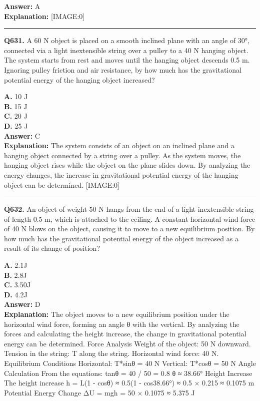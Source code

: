 \documentclass[12pt]{article}
\begin{document}
\textbf{Answer:} A \\
\textbf{Explanation:} [IMAGE:0]

\hrule
\vspace{1em}


\noindent
\textbf{Q631.} A 60 N object is placed on a smooth inclined plane with an angle of 30°, connected via a light inextensible string over a pulley to a 40 N hanging object. The system starts from rest and moves until the hanging object descends 0.5 m. Ignoring pulley friction and air resistance, by how much has the gravitational potential energy of the hanging object increased?



\textbf{A.} 10 J \\
\textbf{B.} 15 J \\
\textbf{C.} 20 J \\
\textbf{D.} 25 J \\

\textbf{Answer:} C \\
\textbf{Explanation:} The system consists of an object on an inclined plane and a hanging object connected by a string over a pulley. As the system moves, the hanging object rises while the object on the plane slides down. By analyzing the energy changes, the increase in gravitational potential energy of the hanging object can be determined.
[IMAGE:0]

\hrule
\vspace{1em}


\noindent
\textbf{Q632.} An object of weight 50 N hangs from the end of a light inextensible string of length 0.5 m, which is attached to the ceiling. A constant horizontal wind force of 40 N blows on the object, causing it to move to a new equilibrium position. By how much has the gravitational potential energy of the object increased as a result of its change of position?



\textbf{A.} 2.1J \\
\textbf{B.} 2.8J \\
\textbf{C.} 3.50J \\
\textbf{D.} 4.2J \\

\textbf{Answer:} D \\
\textbf{Explanation:} The object moves to a new equilibrium position under the horizontal wind force, forming an angle θ with the vertical. By analyzing the forces and calculating the height increase, the change in gravitational potential energy can be determined.
Force Analysis
Weight of the object: 50 N downward.
Tension in the string: T along the string.
Horizontal wind force: 40 N.
Equilibrium Conditions
Horizontal: T*sinθ = 40 N
Vertical: T*cosθ = 50 N
Angle Calculation
From the equations:
tanθ = 40 / 50 = 0.8 \to  θ ≈ 38.66°
Height Increase
The height increase h = L(1 - cosθ) ≈ 0.5(1 - cos38.66°) ≈ 0.5 × 0.215 ≈ 0.1075 m
Potential Energy Change
ΔU = mgh = 50 × 0.1075 ≈ 5.375 J
\end{document}
